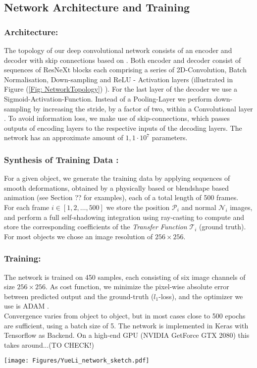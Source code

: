 \subsection{ Network Architecture and Training}
\subsubsection*{Architecture: \\} 
The topology of our deep convolutional network consists of an encoder and decoder with skip connections based on \cite{U-Net}. Both encoder and decoder consist of sequences of ResNeXt blocks \cite{ResNeXt} each comprising a series of 2D-Convolution, Batch Normalisation, Down-sampling and ReLU - Activation layers (illustrated in Figure (\ref{Fig: NetworkTopology}) ). For the last layer of the decoder we use a Sigmoid-Activation-Function. Instead of a Pooling-Layer we perform down-sampling by increasing the stride, by a factor of two, within a Convolutional layer \cite{StridingConv}. To avoid information loss,  we make use of skip-connections, which passes outputs of encoding layers to the respective inputs of the decoding layers. The network has an approximate amount of $1,1 \cdot 10^7$ parameters. 
\subsubsection*{Synthesis of Training Data :\\}
For a given object, we generate the training data by applying sequences of smooth deformations, obtained by a physically based or blendshape based animation (see Section ?? for examples), each of a total length of 500 frames. 
\\
For each frame $i \in [1,2,\dots,500]$ we store the position $\mathcal{P}_i$  and normal $\mathcal{N}_i$ images, and perform a full self-shadowing integration using ray-casting to compute and store the corresponding coefficients of the \textit{Transfer Function} $\mathcal{T}_i$ (ground truth).
\\
For most objects we chose an image resolution of $256 \times 256$. 
\subsubsection*{Training: \\} 
The network is trained on 450 samples, each consisting of six image channels of size $256 \times 256$. As cost function, we minimize the pixel-wise absolute error between predicted output and the ground-truth ($l_1$-loss), and the optimizer we use is ADAM \cite{ADAM}. 
\\
Convergence varies from object to object, but in most cases close to 500 epochs are sufficient, using a batch size of 5. The network is implemented in Keras \cite{Keras} with Tensorflow as Backend. On a high-end GPU (NVIDIA GetForce GTX 2080) this takes around...(TO CHECK!)
\begin{figure*}[t]
  \centering
    \texttt{[image: Figures/YueLi\_network\_sketch.pdf]}
     \caption{Network Topology}
     \label{Fig: NetworkTopology}
\end{figure*}

  


